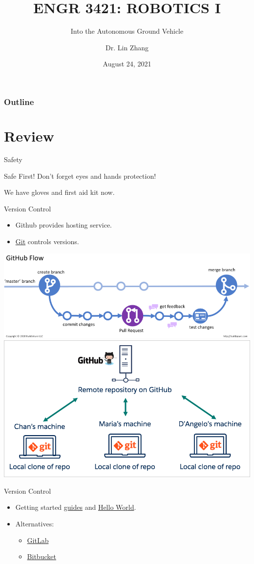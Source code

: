 \documentclass[12pt,letterpaper]{beamer}
\title[Robotics I]
{ENGR 3421: ROBOTICS I}
\subtitle{Into the Autonomous Ground Vehicle}
\author[Zhang, Lin]
{Dr. Lin Zhang}
\institute[UCA] %
{
  Department of Physics and Astronomy\\
  University of Central Arkansas
}
\date[Robotics1 2021] %
{August 24, 2021}
\begin{document}
\frame{\titlepage}

\begin{frame}
\frametitle{Outline}
\tableofcontents
\end{frame}


\section{Review}

\begin{frame}{Safety}
    \begin{alertblock}{Safe First!}
        Don't forget eyes and hands protection!
    \end{alertblock}
    We have gloves and first aid kit now.
\end{frame}

\begin{frame}{Version Control}
    \begin{itemize}
        \item Github provides hosting service.
        \item \href{https://git-scm.com/about}{Git} controls versions.   
    \end{itemize}        
    \includegraphics[width=.65\textwidth]{git_flow}
    \includegraphics[width=.3\textwidth]{github_and_clones}
\end{frame}

\begin{frame}{Version Control}
    \begin{itemize}
        \item Getting started \href{https://docs.github.com/en/get-started}{guides} and \href{https://guides.github.com/activities/hello-world/}{Hello World}. 
        \item Alternatives: 
        \begin{itemize}
            \item \href{https://about.gitlab.com/}{GitLab}
            \item \href{https://bitbucket.org/product}{Bitbucket}
        \end{itemize}
    \end{itemize}
\end{frame}
\end{document}
